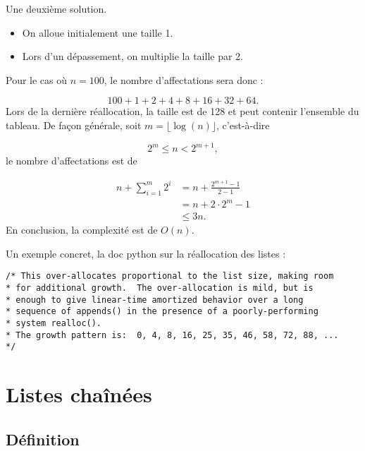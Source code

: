 \documentclass{../cours}
\begin{document}
\begin{Example}
Une deuxième solution.
\begin{itemize}
\item On alloue initialement une taille 1.
\item Lors d'un dépassement, on multiplie la taille par 2.
\end{itemize}

Pour le cas où $n=100$, le nombre d'affectations sera donc :

\begin{equation}
100 + 1 + 2 + 4 + 8 + 16 + 32 + 64.
\end{equation}
Lors de la dernière réallocation, la taille est de 128 et peut contenir l'ensemble du tableau. De façon générale, soit $m = \lfloor \log(n) \rfloor$, c'est-à-dire

\begin{equation}
2^m \leq n < 2^{m+1},
\end{equation}
le nombre d'affectations est de

\begin{align} 
n + \sum_{i=1}^m 2^i &= n + \frac{2^{m+1} - 1}{2 - 1} \\
&= n + 2\cdot 2^m - 1 \\
&\leq 3n.
\end{align}
En conclusion, la complexité est de $O(n)$.

\end{Example}

\begin{Example}
Un exemple concret, la doc python sur la réallocation des listes :

\begin{lstlisting}
/* This over-allocates proportional to the list size, making room
* for additional growth.  The over-allocation is mild, but is
* enough to give linear-time amortized behavior over a long
* sequence of appends() in the presence of a poorly-performing
* system realloc().
* The growth pattern is:  0, 4, 8, 16, 25, 35, 46, 58, 72, 88, ...
*/
\end{lstlisting}
\end{Example}

\section{Listes chaînées}

\subsection{Définition}
\end{document}
